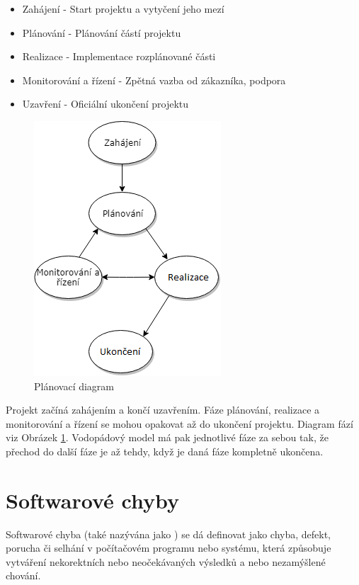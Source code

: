 \documentclass[czech,DP]{thesiskiv}
\begin{document}
\begin{itemize}
	\item {Zahájení} - Start projektu a vytyčení jeho mezí
	\item {Plánování} - Plánování částí projektu
	\item {Realizace} - Implementace rozplánované části
	\item {Monitorování a řízení} - Zpětná vazba od zákazníka, podpora
	\item {Uzavření} - Oficiální ukončení projektu
\end{itemize}


\begin{figure}[!ht]
\begin{center}
	\includegraphics[scale=1.25]{Pic/planingDiagram.png}
\end{center}
\label{pic:planingDiagram}
\caption{Plánovací diagram}
\end{figure}


Projekt začíná zahájením a končí uzavřením. Fáze plánování, realizace a monitorování a řízení se mohou opakovat až do ukončení projektu. Diagram fází viz Obrázek \ref{pic:planingDiagram}. Vodopádový model má pak jednotlivé fáze za sebou tak, že přechod do další fáze je až tehdy, když je daná fáze kompletně ukončena.

\section{Softwarové chyby}
Softwarové chyba (také nazývána jako ) se dá definovat jako chyba, defekt, porucha či selhání v počítačovém programu nebo systému, která způsobuje vytváření nekorektních nebo neočekávaných výsledků a nebo nezamýšlené chování. 
\end{document}
